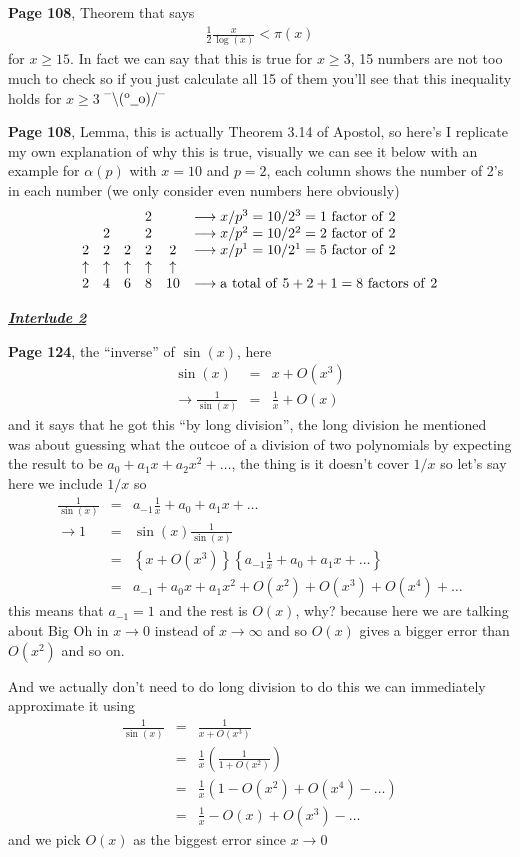 \documentclass[aps,preprint,preprintnumbers,nofootinbib,showpacs,prd]{revtex4-1}
\newcommand{\nbea}{\begin{eqnarray*}}
\newcommand{\neea}{\end{eqnarray*}}
\newcommand{\dunno}{$ {}^{\mbox {--}}\backslash(^{\rm o}{}\underline{\hspace{0.2cm}}{\rm o})/^{\mbox {--}}$}
\begin{document}
{\bf Page 108}, Theorem that says
%
\nbea
\frac{1}{2}\frac{x}{\log(x)} < \pi(x)
\neea
%
for $x\ge15$. In fact we can say that this is true for $x\ge3$, 15 numbers are not too much to check so if you just calculate all 15 of them you'll see that this inequality holds for $x\ge3$ \dunno

{\bf Page 108}, Lemma, this is actually Theorem 3.14 of Apostol, so here's I replicate my own explanation of why this is true, visually we can see it below with an example for  $\alpha(p)$ with $x=10$ and $p=2$, each column shows the number of 2's in each number (we only consider even numbers here obviously)
%
\nbea
\begin{array}{c c c c c l}
   &    &   & 2  &  & \longrightarrow x/p^3 = 10/2^3 = 1 {\rm~factor~of~} 2\\
   & 2 &    & 2 &   & \longrightarrow x/p^2 = 10/2^2 = 2 {\rm~factor~of~} 2\\
2 & 2 & 2 & 2 & 2 & \longrightarrow x/p^1 = 10/2^1 = 5 {\rm~factor~of~} 2\\
\uparrow & \uparrow & \uparrow & \uparrow & \uparrow \\
2 & 4 & 6 & 8 & 10 & \longrightarrow {\rm a~total~of~}5+2+1=8{\rm~factors~of~}2
\end{array}
\neea
%

\bigskip
\underline{\textbf{\textit{Interlude 2}}}
\bigskip

{\bf Page 124}, the ``inverse'' of $\sin(x)$, here
%
\nbea
\sin(x) & = & x + O(x^3) \\
\to \frac{1}{\sin(x)} & = & \frac{1}{x} + O(x)
\neea
%
and it says that he got this ``by long division'', the long division he mentioned was about guessing what the outcoe of a division of two polynomials by expecting the result to be $a_0 + a_1x + a_2x^2 + \ldots$, the thing is it doesn't cover $1/x$ so let's say here we include $1/x$ so
%
\nbea
\frac{1}{\sin(x)} & = & a_{-1}\frac{1}{x} + a_0 + a_1 x + \ldots \\
\to 1 & = & \sin(x) \frac{1}{\sin(x)} \\
& = & \left\{x + O(x^3)\right \}\left\{a_{-1}\frac{1}{x} + a_0 + a_1 x + \ldots\right\} \\
& = & a_{-1} + a_0 x + a_1 x^2 + O(x^2) + O(x^3) + O(x^4) + \ldots
\neea
%
this means that $a_{-1} = 1$ and the rest is $O(x)$, why? because here we are talking about Big Oh in $x\to 0$ instead of $x\to\infty$ and so $O(x)$ gives a bigger error than $O(x^2)$ and so on.

And we actually don't need to do long division to do this we can immediately approximate it using
%
\nbea
\frac{1}{\sin(x)} & = & \frac{1}{x + O(x^3)} \\
& = & \frac{1}{x} \left(\frac{1}{1+O(x^2)}\right) \\
& = & \frac{1}{x} \left(1-O(x^2)+O(x^4)-\ldots \right) \\
& = & \frac{1}{x} - O(x) + O(x^3)-\ldots
\neea
%
and we pick $O(x)$ as the biggest error since $x\to0$
\end{document}
